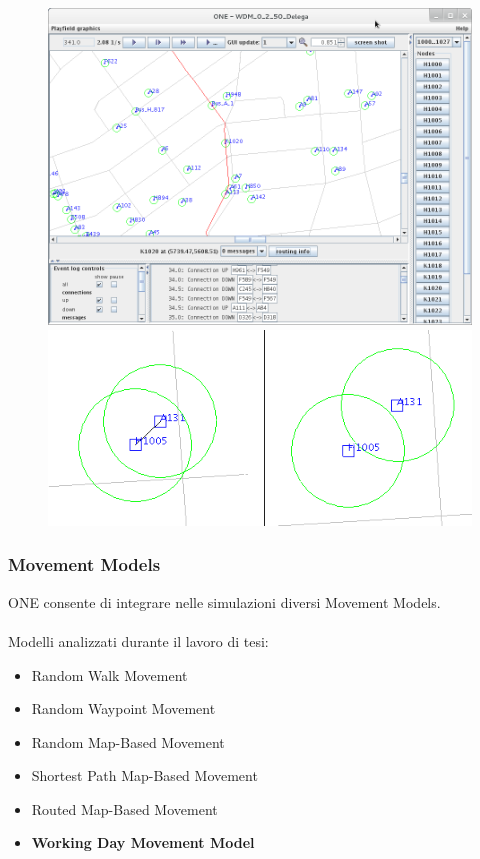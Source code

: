 \documentclass{beamer}
\begin{document}
\begin{frame}
\begin{figure}[ht]
\begin{minipage}[b]{0.4\linewidth}
\centering
\includegraphics[scale=0.12]{img/Schermata-ONE.png}
\end{minipage}
\hspace{0.5cm}
\begin{minipage}[b]{0.4\linewidth}
\centering
\includegraphics[scale=0.28]{img/connessioni.png}
\end{minipage}
\end{figure}
\end{frame}



\begin{frame}
\label{movement models}
\frametitle{Movement Models}
ONE consente di integrare nelle simulazioni diversi Movement Models.\\
\ \\
\pause
Modelli analizzati durante il lavoro di tesi:
\begin{itemize}
\item Random Walk Movement
\item Random Waypoint Movement
\pause
\item Random Map-Based Movement
\item Shortest Path Map-Based Movement
\item Routed Map-Based Movement
\item \textbf{Working Day Movement Model}
\end{itemize}
\end{frame}
\end{document}
